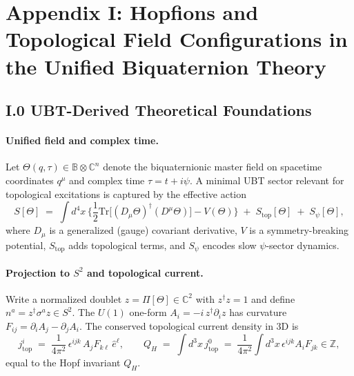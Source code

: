 
\appendix
\section*{Appendix I: Hopfions and Topological Field Configurations in the Unified Biquaternion Theory}


\subsection*{I.0 UBT-Derived Theoretical Foundations}
\paragraph{Unified field and complex time.}
Let $\Theta(q,\tau)\in\mathbb{B}\otimes\mathbb{C}^n$ denote the biquaternionic master field on spacetime coordinates $q^\mu$ and complex time $\tau=t+i\psi$.
A minimal UBT sector relevant for topological excitations is captured by the effective action
\begin{equation}
S[\Theta] \;=\; \int d^4x \, \Big\{
\frac{1}{2}\mathrm{Tr}\big[(D_\mu \Theta)^\dagger (D^\mu \Theta)\big]
- V(\Theta) \Big\}
\;+\; S_{\text{top}}[\Theta]\;+\;S_{\psi}[\Theta],
\end{equation}
where $D_\mu$ is a generalized (gauge) covariant derivative, $V$ is a symmetry-breaking potential, $S_{\text{top}}$ adds topological terms, and $S_{\psi}$ encodes slow $\psi$-sector dynamics.

\paragraph{Projection to $S^2$ and topological current.}
Write a normalized doublet $z=\Pi[\Theta]\in \mathbb{C}^2$ with $z^\dagger z=1$ and define $n^a=z^\dagger\sigma^a z\in S^2$.
The $U(1)$ one-form $A_i=-i\,z^\dagger\partial_i z$ has curvature $F_{ij}=\partial_iA_j-\partial_jA_i$.
The conserved topological current density in $3$D is
\begin{equation}
j_{\text{top}}^i \;=\; \frac{1}{4\pi^2}\,\epsilon^{ijk}\, A_j F_{k\ell}\, \hat{e}^\ell,\qquad
Q_H \;=\; \int d^3x\, j^0_{\text{top}} \;=\; \frac{1}{4\pi^2}\int d^3x\, \epsilon^{ijk} A_i F_{jk}\in\mathbb{Z},
\end{equation}
equal to the Hopf invariant $Q_H$.

